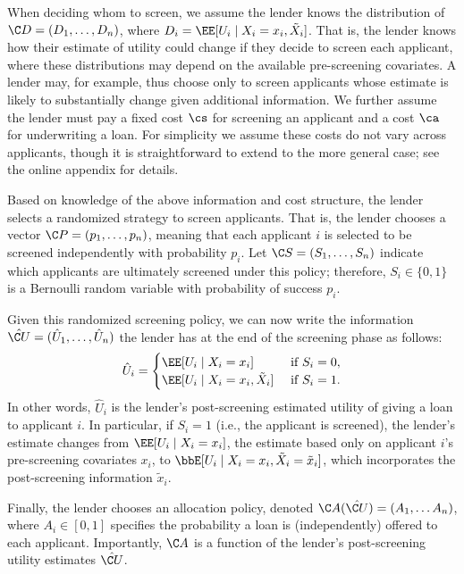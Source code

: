 \documentclass[10pt]{article}
\begin{document}
\begin{ReviewVerbatim}
When deciding whom to screen, we assume
the lender knows the distribution of \(\C D = (D_1, \ldots, D_n)\), where \(D_i = \EE[U_i \mid X_i = x_i, \tilde{X}_i]\).
That is, the lender knows how their estimate of utility could change if they decide to screen each applicant, where these distributions may depend on the available pre-screening covariates.
A lender may, for example, thus choose only to screen applicants whose estimate is likely to substantially change given additional information.
We further assume the lender must pay a
fixed cost \(\cs\) for screening an applicant
and a cost \(\ca\) for underwriting a loan.
For simplicity we assume these costs do not vary across applicants, though it is straightforward to extend to the more general case; see the online appendix for details.

Based on knowledge of the above information and cost structure, the lender selects a randomized strategy to screen applicants.
That is, the lender chooses a vector
\(\C P = (p_1, \dots, p_n)\), meaning that each applicant \(i\) is selected to be screened independently with probability \(p_i\).
Let \(\C S = (S_1, \dots, S_n)\) indicate which applicants are ultimately screened under this policy; therefore, \(S_i \in \{0,1\}\) is a Bernoulli random variable with probability of success \(p_i\).

Given this randomized screening policy, we can now write the information \(\hat {\C U} = (\hat U_1, \ldots, \hat U_n)\) the lender has at the end of the screening phase as follows:
    \begin{equation}
        \hat U_i = \begin{cases}
            \EE[U_i \mid X_i = x_i] & \text{ if } S_i = 0, \\
            \EE[U_i \mid X_i = x_i, \tilde{X}_i] & \text{ if } S_i =1.
        \end{cases}
    \end{equation}
In other words, \(\hat U_i\) is the lender's post-screening estimated utility of giving a loan to applicant \(i\).
In particular, if \(S_i = 1\) (i.e., the applicant is screened), the lender's estimate changes from \(\EE[U_i\mid X_i = x_i]\),
the estimate based only on applicant \(i\)'s pre-screening covariates \(x_i\),
to
\(\bbE[U_i \mid X_i = x_i, \tilde{X}_i = \tilde{x}_i] \), which incorporates the post-screening information \(\tilde{x}_i\).

Finally, the lender chooses an allocation policy, denoted \(\C A(\hat {\C U}) = (A_1, \dots A_n)\),
where \(A_i \in [0,1]\)
specifies the probability a loan is (independently) offered to each applicant.
Importantly, \(\C A\) is a function of
the lender's post-screening utility estimates
\(\hat {\C U}\).


\end{ReviewVerbatim}
\end{document}
